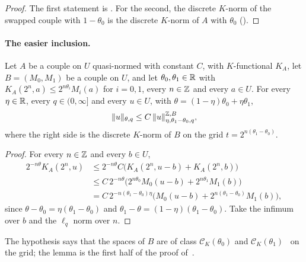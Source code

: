 \begin{proof}
\leanok
The first statement is . For the second, the discrete
$K$-norm of the swapped couple with $1 - \theta_0$ is the discrete $K$-norm of $A$ with
$\theta_0$ ().
\end{proof}

\paragraph{The easier inclusion.}

\begin{lemma}
\label{lem:reiteration-class-ck}
\leanok
{}
Let $A$ be a couple on $U$ quasi-normed with constant $C$, with $K$-functional $K_A$, let
$B = (M_0, M_1)$ be a couple on $U$, and let $\theta_0, \theta_1 \in \mathbb{R}$ with
$K_A(2^n, a) \leq 2^{n\theta_i} M_i(a)$ for $i = 0, 1$, every $n \in \mathbb{Z}$ and every $a \in U$. For
every $\eta \in \mathbb{R}$, every $q \in (0, \infty]$ and every $u \in U$, with
$\theta = (1 - \eta)\theta_0 + \eta\theta_1$,
\[
  \|u\|_{\theta, q} \leq C \, \|u\|^{\mathbb{Z}, B}_{\eta, \theta_1 - \theta_0, q} ,
\]
where the right side is the discrete $K$-norm of $B$ on the grid $t = 2^{n(\theta_1 - \theta_0)}$.
\end{lemma}

\begin{proof}
\leanok
For every $n \in \mathbb{Z}$ and every $b \in U$,
\begin{align*}
  2^{-n\theta} K_A(2^n, u) &\leq 2^{-n\theta} C \bigl(K_A(2^n, u - b) + K_A(2^n, b)\bigr) \\
  &\leq C \, 2^{-n\theta} \bigl(2^{n\theta_0} M_0(u - b) + 2^{n\theta_1} M_1(b)\bigr) \\
  &= C \, 2^{-n(\theta_1 - \theta_0)\eta} \bigl(M_0(u - b) + 2^{n(\theta_1 - \theta_0)}
  M_1(b)\bigr) ,
\end{align*}
since $\theta - \theta_0 = \eta(\theta_1 - \theta_0)$ and
$\theta_1 - \theta = (1 - \eta)(\theta_1 - \theta_0)$. Take the infimum over $b$ and the $\ell_q$
norm over $n$.
\end{proof}

The hypothesis says that the spaces of $B$ are of class $\mathcal{C}_K(\theta_0)$ and
$\mathcal{C}_K(\theta_1)$~\cite[Definition~3.5.1]{BerghLofstrom} on the grid; the lemma is the
first half of the proof of~\cite[Theorem~3.5.3]{BerghLofstrom}.

